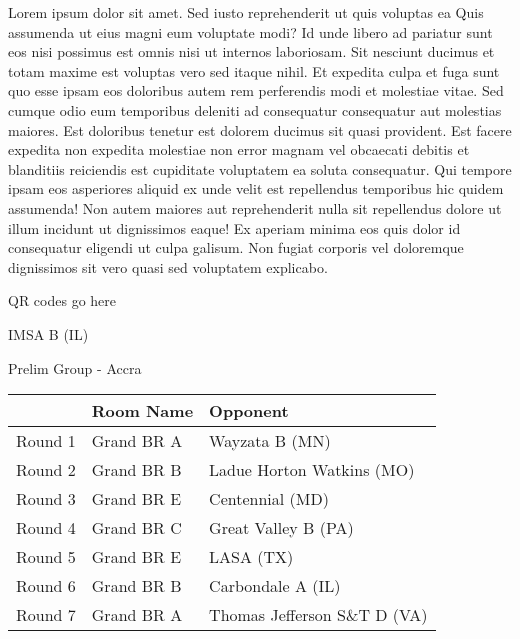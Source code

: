 \documentclass{article}%
\begin{document}
\newline%
\newline%
Lorem ipsum dolor sit amet. Sed iusto reprehenderit ut quis voluptas ea Quis assumenda ut eius magni eum voluptate modi? Id unde libero ad pariatur sunt eos nisi possimus est omnis nisi ut internos laboriosam. Sit nesciunt ducimus et totam maxime est voluptas vero sed itaque nihil. Et expedita culpa et fuga sunt quo esse ipsam eos doloribus autem rem perferendis modi et molestiae vitae.\newline%
\newline%
Sed cumque odio eum temporibus deleniti ad consequatur consequatur aut molestias maiores. Est doloribus tenetur est dolorem ducimus sit quasi provident. Est facere expedita non expedita molestiae non error magnam vel obcaecati debitis et blanditiis reiciendis est cupiditate voluptatem ea soluta consequatur. Qui tempore ipsam eos asperiores aliquid ex unde velit est repellendus temporibus hic quidem assumenda!\newline%
\newline%
Non autem maiores aut reprehenderit nulla sit repellendus dolore ut illum incidunt ut dignissimos eaque! Ex aperiam minima eos quis dolor id consequatur eligendi ut culpa galisum. Non fugiat corporis vel doloremque dignissimos sit vero quasi sed voluptatem explicabo.\newline%
\newline%
%
\vspace*{30pt}%
\begin{center}%
\begin{Huge}%
QR codes go here%
\end{Huge}%
\end{center}%
\newpage%
%
\begin{center}%
\begin{Huge}%
IMSA B (IL)%
\end{Huge}%
\vspace*{8pt}%
\linebreak%
\begin{Large}%
Prelim Group {-} Accra%
\end{Large}%
\end{center}%
\begin{tabularx}{\textwidth}{|c|Y|Y|}%
\hline%
&Room Name&Opponent\\%
\hline%
Round 1&Grand BR A&Wayzata B (MN)\\%
Round 2&Grand BR B&Ladue Horton Watkins (MO)\\%
Round 3&Grand BR E&Centennial (MD)\\%
Round 4&Grand BR C&Great Valley B (PA)\\%
Round 5&Grand BR E&LASA (TX)\\%
Round 6&Grand BR B&Carbondale A (IL)\\%
Round 7&Grand BR A&Thomas Jefferson S\&T D (VA)\\%
\hline%
\end{tabularx}%
\end{document}
